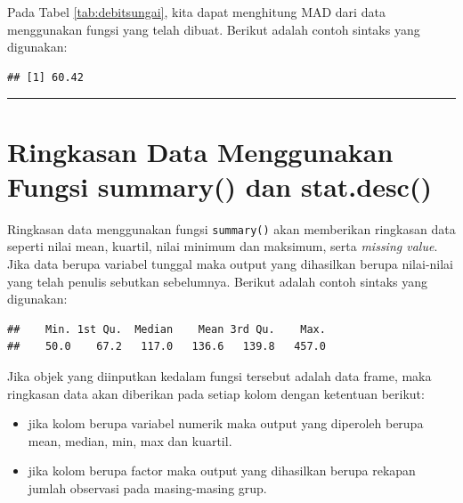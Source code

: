 \documentclass[]{book}
\newenvironment{Shaded}{\begin{snugshade}}{\end{snugshade}}
\newcommand{\KeywordTok}[1]{\textcolor[rgb]{0.13,0.29,0.53}{\textbf{#1}}}
\newcommand{\OperatorTok}[1]{\textcolor[rgb]{0.81,0.36,0.00}{\textbf{#1}}}
\newcommand{\NormalTok}[1]{#1}
\providecommand{\tightlist}{%
  \setlength{\itemsep}{0pt}\setlength{\parskip}{0pt}}
\begin{document}
Pada Tabel \ref{tab:debitsungai}, kita dapat menghitung MAD dari data
menggunakan fungsi yang telah dibuat. Berikut adalah contoh sintaks yang
digunakan:

\begin{Shaded}
\end{Shaded}

\begin{verbatim}
## [1] 60.42
\end{verbatim}

\begin{center}\rule{0.5\linewidth}{\linethickness}\end{center}

\section{Ringkasan Data Menggunakan Fungsi summary() dan
stat.desc()}\label{ringkasan-data-menggunakan-fungsi-summary-dan-stat.desc}

Ringkasan data menggunakan fungsi \texttt{summary()} akan memberikan
ringkasan data seperti nilai mean, kuartil, nilai minimum dan maksimum,
serta \emph{missing value}. Jika data berupa variabel tunggal maka
output yang dihasilkan berupa nilai-nilai yang telah penulis sebutkan
sebelumnya. Berikut adalah contoh sintaks yang digunakan:

\begin{Shaded}
\end{Shaded}

\begin{verbatim}
##    Min. 1st Qu.  Median    Mean 3rd Qu.    Max. 
##    50.0    67.2   117.0   136.6   139.8   457.0
\end{verbatim}

Jika objek yang diinputkan kedalam fungsi tersebut adalah data frame,
maka ringkasan data akan diberikan pada setiap kolom dengan ketentuan
berikut:

\begin{itemize}
\tightlist
\item
  jika kolom berupa variabel numerik maka output yang diperoleh berupa
  mean, median, min, max dan kuartil.
\item
  jika kolom berupa factor maka output yang dihasilkan berupa rekapan
  jumlah observasi pada masing-masing grup.
\end{itemize}
\end{document}
